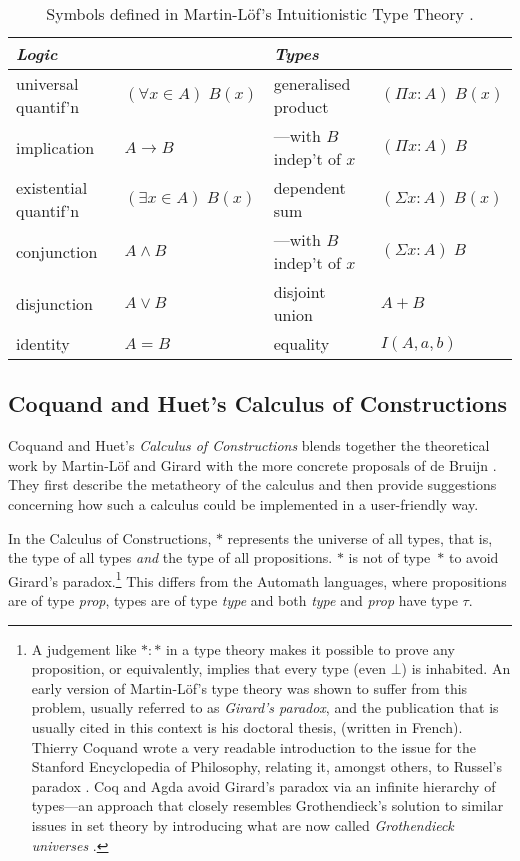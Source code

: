 \documentclass[12pt,toc=bibliography,numbers=noendperiod,
               footnotes=multiple,twoside]{scrartcl}
\begin{document}
\begin{table}[h]
    \centering
    \begin{tabular}{l l l l}
        \toprule
        \textit{Logic} & & \textit{Types} & \\
        \midrule
	universal quantif'n & \((\forall x \in A)\;B(x)\)
		& generalised product & \((\Pi x : A)\;B(x)\) \\
	implication & \(A \rightarrow B\)
		& ---with \(B\) indep't of \(x\) & \((\Pi x : A)\;B\) \\
	existential quantif'n & \((\exists x \in A)\;B(x)\)
		& dependent sum & \((\Sigma x : A)\;B(x)\) \\
	conjunction & \(A \wedge B\)
		& ---with \(B\) indep't of \(x\) & \((\Sigma x : A)\;B\) \\
	disjunction & \(A \vee B\)
		& disjoint union & \(A + B\) \\
	identity & \(A = B\)
		& equality & \(I(A, a, b)\) \\
	
        \bottomrule
    \end{tabular}
    \caption{Symbols defined in Martin-Löf's Intuitionistic Type Theory \parencite{sambin_intuitionistic_1984}.}
    \label{tab:martin-loef}
\end{table}

\subsection{Coquand and Huet's Calculus of Constructions}

Coquand and Huet's \emph{Calculus of Constructions} blends together the theoretical work by Martin-Löf and Girard with the more concrete proposals of de Bruijn \autocite{coquand_calculus_1988}. They first describe the metatheory of the calculus and then provide suggestions concerning how such a calculus could be implemented in a user-friendly way.

In the Calculus of Constructions, \(*\) represents the universe of all types, that is, the type of all types \emph{and} the type of all propositions. \(*\) is not of type~\(*\) to avoid Girard's paradox.\footnote{A judgement like \(* : *\) in a type theory makes it possible to prove any proposition, or equivalently, implies that every type (even \(\bot\)) is inhabited. An early version of Martin-Löf's type theory was shown to suffer from this problem, usually referred to as \emph{Girard's paradox}, and the publication that is usually cited in this context is his doctoral thesis, \textcite{girard_interpretation_1972} (written in French). Thierry Coquand wrote a very readable introduction to the issue for the Stanford Encyclopedia of Philosophy, relating it, amongst others, to Russel's paradox \autocite{coquand_type_2014}. Coq and Agda avoid Girard's paradox via an infinite hierarchy of types---an approach that closely resembles Grothendieck's solution to similar issues in set theory by introducing what are now called \emph{Grothendieck universes} \autocite{artin_orie_1972}.} This differs from the Automath languages, where propositions are of type \textit{prop}, types are of type \textit{type} and both \textit{type} and \textit{prop} have type \(\tau\).
\end{document}
